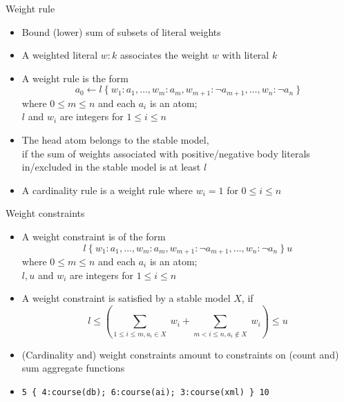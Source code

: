 \begin{frame}{Weight rule}
  \label{eqn:weight:rule}
  \begin{itemize}
  \item {} Bound (lower) sum of subsets of literal weights
  \item {} A \alert{weighted literal} $w:k$ associates the weight $w$ with literal $k$
  \item {} A \alert{weight rule} is the form
    \[
      a_0\leftarrow l~\{\ w_1:a_1,\dots,w_m:a_m,w_{m+1}:\neg a_{m+1},\dots,w_n:\neg a_n\ \}
    \]
    where $0\leq m\leq n$ and each $a_i$ is an atom;\\
    $l$ and $w_i$ are integers for $1\leq i\leq n$
    \medskip
  \item<2-> 
    The head atom belongs to the stable model,\\
    if the sum of weights associated with positive/negative body literals in/excluded in the stable model
    is at least $l$
    \medskip
  \item<3->  A cardinality rule is a weight rule where $w_i=1$  for $0\leq i\leq n$
  \end{itemize}
\end{frame}
\begin{frame}[fragile]{Weight constraints}
  \begin{itemize}
  \item {} A \alert{weight constraint} is of the form
    \[
    l~\{\ w_1:a_1,\dots,w_m:a_m,w_{m+1}:\neg a_{m+1},\dots,w_n:\neg a_n\ \}~u
    \]
    where $0\leq m\leq n$ and each $a_i$ is an atom;\\
    $l,u$ and $w_i$ are integers for $1\leq i\leq n$
    \smallskip
  \item<2->  A weight constraint is satisfied by a stable model $X$, if
    \[
    l\leq\left(
      \textstyle{\sum_{1\leq i\leq m, a_i    \in X}}\; w_i
      +
      \textstyle{\sum_{m <   i\leq n, a_i\not\in X}}\; w_i
    \right)\leq u
    \]
  \item<3->  (Cardinality and) weight constraints amount to constraints on (count and) sum aggregate functions
    \medskip
  \item<4-> 
\begin{lstlisting}[basicstyle=\ttfamily\small]
5 { 4:course(db); 6:course(ai); 3:course(xml) } 10
\end{lstlisting}
  \end{itemize}
\end{frame}
